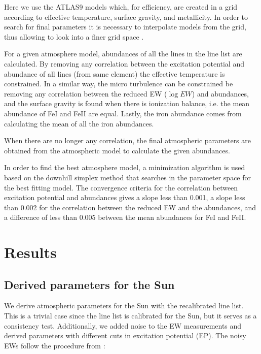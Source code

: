 \documentclass{aa}
\begin{document}
Here we use the ATLAS9 models which, for efficiency, are created
in a grid according to effective temperature, surface gravity, and
metallicity. In order to search for final parameters it is necessary to
interpolate models from the grid, thus allowing to look into a finer
grid space \citep[see e.g.][]{Sousa2014}.

For a given atmosphere model, abundances of all the lines in the line
list are calculated. By removing any correlation between the excitation
potential and abundance of all lines (from same element) the effective
temperature is constrained. In a similar way, the micro turbulence can
be constrained be removing any correlation between the reduced EW ($\log
EW$) and abundances, and the surface gravity is found when there is
ionization balance, i.e. the mean abundance of FeI and FeII are equal.
Lastly, the iron abundance comes from calculating the mean of
all the iron abundances.

When there are no longer any correlation, the final atmospheric
parameters are obtained from the atmospheric model to calculate the
given abundances.

In order to find the best atmosphere model, a minimization algorithm
is used based on the downhill simplex method \citep{Press1992} that
searches in the parameter space for the best fitting model. The
convergence criteria for the correlation between excitation potential
and abundances gives a slope less than 0.001, a slope less than 0.002
for the correlation between the reduced EW and the abundances, and a
difference of less than 0.005 between the mean abundances for FeI and
FeII.







\section{Results}
\label{sec:results}


\subsection{Derived parameters for the Sun}
\label{sec:derived_parameters_of_the_sun}

We derive atmospheric parameters for the Sun with the recalibrated line
list. This is a trivial case since the line list is calibrated for the
Sun, but it serves as a consistency test. Additionally, we added noise
to the EW measurements and derived parameters with different cuts in
excitation potential (EP). The noisy EWs follow the procedure from
\cite{Caryel1988}:
\end{document}
